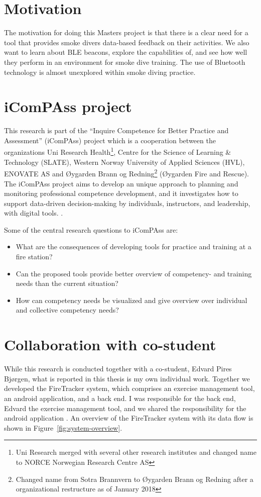 \documentclass[../Main/thesis.tex]{subfiles}
\begin{document}
\section{Motivation}
The motivation for doing this Masters project is that there is a clear need for a tool that provides smoke divers data-based feedback on their activities.
We also want to learn about BLE beacons, explore the capabilities of, and see how well they perform in an environment for smoke dive training.
The use of Bluetooth technology is almost unexplored within smoke diving practice.

\section{iComPAss project}
This research is part of the ``Inquire Competence for Better Practice and Assessment'' (iComPAss) project which is a cooperation between the organizations Uni Research Health\footnote{Uni Research merged with several other research institutes and changed name to NORCE Norwegian Research Centre AS}, Centre for the Science of Learning \& Technology (SLATE), Western Norway University of Applied Sciences (HVL), ENOVATE AS and Øygarden Brann og Redning\footnote{Changed name from Sotra Brannvern to Øygarden Brann og Redning after a organizational restructure as of January 2018} (Øygarden Fire and Rescue).
The iComPAss project aims to develop an unique approach to planning and monitoring professional competence development, and it investigates how to support data-driven decision-making by individuals, instructors, and leadership, with digital tools. \citep{Netteland2016}.

Some of the central research questions to iComPAss are:
\begin{itemize}
	\item What are the consequences of developing tools for practice and training at a fire station?
	\item Can the proposed tools provide better overview of competency- and training needs than the current situation?
	\item How can competency needs be visualized and give overview over individual and collective competency needs?
\end{itemize}

\section{Collaboration with co-student}
While this research is conducted together with a co-student, Edvard Pires Bjørgen, what is reported in this thesis is my own individual work.
Together we developed the FireTracker system, which comprises an exercise management tool, an android application, and a back end.
I was responsible for the back end, Edvard the exercise management tool, and we shared the responsibility for the android application \citep{Bjorgen2018}.
An overview of the FireTracker system with its data flow is shown in Figure~\ref{fig:system-overview}.
\end{document}
